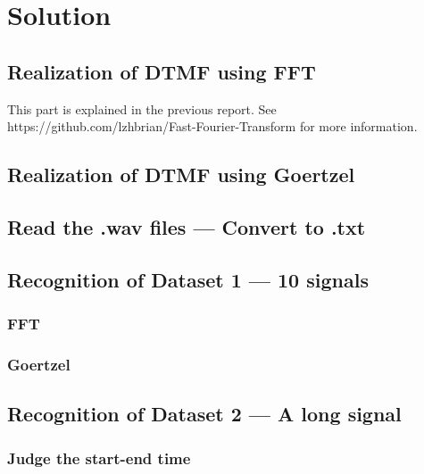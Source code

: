 \documentclass[UTF8,a4paper,twocolumn]{ctexart}
\begin{document}
\section{Solution}



\subsection{Realization of DTMF using FFT}
This part is explained in the previous report. See https://github.com/lzhbrian/Fast-Fourier-Transform for more information.


\subsection{Realization of DTMF using Goertzel}

\subsection{Read the .wav files --- Convert to .txt}

\subsection{Recognition of Dataset 1 --- 10 signals}
	
	\subsubsection{FFT}
	
	\subsubsection{Goertzel}


\subsection{Recognition of Dataset 2 --- A long signal}

	\subsubsection{Judge the start-end time}
\end{document}
